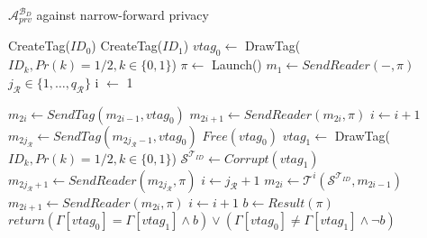     \begin{algorithm}[H] %
        \centering
        \caption{$\mathcal{A}_{prv}^{\mathcal{B}_D}$ against narrow-forward privacy}
        \begin{algorithmic}[1] %
            \State CreateTag($ID_0$)  
            \State CreateTag($ID_1$)  
            \State $vtag_{0} \leftarrow$ DrawTag($ID_k, Pr(k)= 1/2, k \in \{0,1\}$)  
            \State $\pi \leftarrow$ Launch()  
            \State $m_1 \leftarrow SendReader(-,\pi)$  
            \State $j_{\mathcal{R}} \in \{1, \dots, q_\mathcal{R}\}$
            \State i $\leftarrow$ 1

                \State $m_{2i} \gets SendTag(m_{2i-1}, vtag_{0})$  
                \State $m_{2i+1} \gets SendReader(m_{2i}, \pi)$  
                \State $i \gets i+1$
            \EndWhile
            \State $m_{2j_{\mathcal{R}}} \gets SendTag(m_{2j_{\mathcal{R}}-1}, vtag_{0})$ 
            \State $Free(vtag_{0})$
            \State $vtag_{1} \leftarrow$ DrawTag($ID_k, Pr(k)= 1/2, k \in \{0,1\}$)
            \State $\mathcal{S}^{\mathcal{T}_{ID}} \gets Corrupt(vtag_{1})$  
            \State $m_{2j_{\mathcal{R}}+1} \gets SendReader(m_{2j_{\mathcal{R}}}, \pi)$  
            \State $i \gets j_{\mathcal{R}}+1$
                \State $m_{2i} \gets \mathcal{T}^{i}(\mathcal{S}^{\mathcal{T}_{ID}}, m_{2i-1})$  
                \State $m_{2i+1} \gets SendReader(m_{2i}, \pi)$  
                \State $i \gets i+1$
            \EndWhile 
            \State $b \gets Result(\pi)$  
            \State $return (\Gamma[vtag_{0}] = \Gamma[vtag_{1}] \land b) \lor (\Gamma[vtag_{0}] \neq \Gamma[vtag_{1}] \land \lnot b)$
        \end{algorithmic}
    \end{algorithm}


